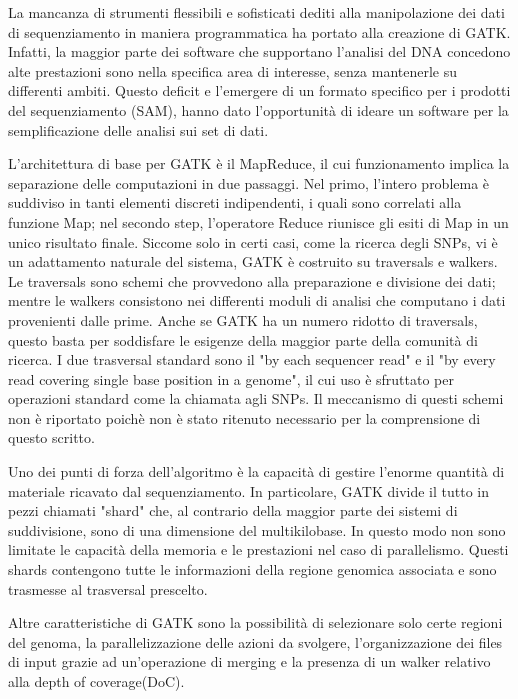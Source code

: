La mancanza di strumenti flessibili e sofisticati dediti alla manipolazione dei dati di sequenziamento in maniera programmatica ha portato alla creazione di GATK.
Infatti, la maggior parte dei software che supportano l'analisi del DNA concedono alte prestazioni sono nella specifica area di interesse, senza mantenerle su differenti ambiti.
Questo deficit e l'emergere di un formato specifico per i prodotti del sequenziamento (SAM), hanno dato l'opportunità di ideare un software per la semplificazione delle analisi sui set di dati.

L'architettura di base per GATK è il MapReduce, il cui funzionamento implica la separazione delle computazioni in due passaggi.
Nel primo, l'intero problema è suddiviso in tanti elementi discreti indipendenti, i quali sono correlati alla funzione Map; nel secondo step, l'operatore Reduce riunisce gli esiti di Map in un unico risultato finale.
Siccome solo in certi casi, come la ricerca degli SNPs, vi è un adattamento naturale del sistema, GATK è costruito su traversals e walkers.
Le traversals sono schemi che provvedono alla preparazione e divisione dei dati; mentre le walkers consistono nei differenti moduli di analisi che computano i dati provenienti dalle prime.
Anche se GATK ha un numero ridotto di traversals, questo basta per soddisfare le esigenze della maggior parte della comunità di ricerca.
I due trasversal standard sono il "by each sequencer read" e il "by every read covering single base position in a genome", il cui uso è sfruttato per operazioni standard come la chiamata agli SNPs.
Il meccanismo di questi schemi non è riportato poichè non è stato ritenuto necessario per la comprensione di questo scritto.

Uno dei punti di forza dell'algoritmo è la capacità di gestire l'enorme quantità di materiale ricavato dal sequenziamento.
In particolare, GATK divide il tutto in pezzi chiamati "shard" che, al contrario della maggior parte dei sistemi di suddivisione, sono di una dimensione del multikilobase.
In questo modo non sono limitate le capacità della memoria e le prestazioni nel caso di parallelismo.
Questi shards contengono tutte le informazioni della regione genomica associata e sono trasmesse al trasversal prescelto.

Altre caratteristiche di GATK sono la possibilità di selezionare solo certe regioni del genoma, la parallelizzazione delle azioni da svolgere, l'organizzazione dei files di input grazie ad un'operazione di merging e la presenza di un walker relativo alla depth of coverage(DoC).

